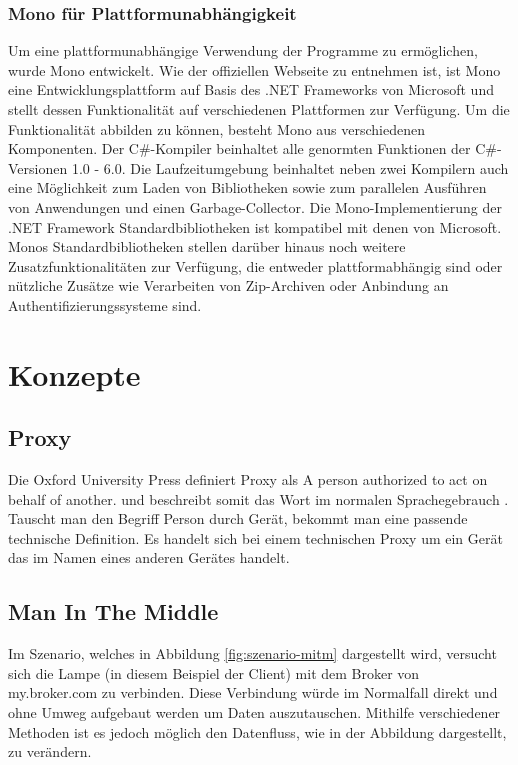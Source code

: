     \subsubsection{Mono für Plattformunabhängigkeit}
        Um eine plattformunabhängige Verwendung der Programme zu ermöglichen, wurde Mono entwickelt.
        Wie der offiziellen Webseite \cite{mono_project_2018} zu entnehmen ist, ist Mono eine Entwicklungsplattform auf Basis des .NET Frameworks von Microsoft und stellt dessen Funktionalität auf verschiedenen Plattformen zur Verfügung. Um die Funktionalität abbilden zu können, besteht Mono aus verschiedenen Komponenten.
        Der C\#-Kompiler beinhaltet alle genormten Funktionen der C\#-Versionen 1.0 - 6.0.
        Die Laufzeitumgebung beinhaltet neben zwei Kompilern auch eine Möglichkeit zum Laden von Bibliotheken sowie zum parallelen Ausführen von Anwendungen und einen Garbage-Collector.
        Die Mono-Implementierung der .NET Framework Standardbibliotheken ist kompatibel mit denen von Microsoft.
        Monos Standardbibliotheken stellen darüber hinaus noch weitere Zusatzfunktionalitäten zur Verfügung, die entweder plattformabhängig sind oder nützliche Zusätze wie Verarbeiten von Zip-Archiven oder Anbindung an Authentifizierungssysteme sind.

\section{Konzepte} \label{TechKonzepte}
    \subsection{Proxy}
    Die Oxford University Press definiert Proxy als \glqq A person authorized to act on behalf of another.\grqq{} und beschreibt somit das Wort im normalen Sprachegebrauch \cite{oxford_university_press_2019}.
    Tauscht man den Begriff \glqq Person\grqq{} durch \glqq Gerät\grqq{}, bekommt man eine passende technische Definition. Es handelt sich bei einem technischen Proxy um ein Gerät das im Namen eines anderen Gerätes handelt.

    \subsection{Man In The Middle}
        Im Szenario, welches in Abbildung \ref{fig:szenario-mitm} dargestellt wird, versucht sich die Lampe (in diesem Beispiel der Client) mit dem Broker von \glqq my.broker.com\grqq{} zu verbinden. Diese Verbindung würde im Normalfall direkt und ohne Umweg aufgebaut werden um Daten auszutauschen. Mithilfe verschiedener Methoden ist es jedoch möglich den Datenfluss, wie in der Abbildung dargestellt, zu verändern.
